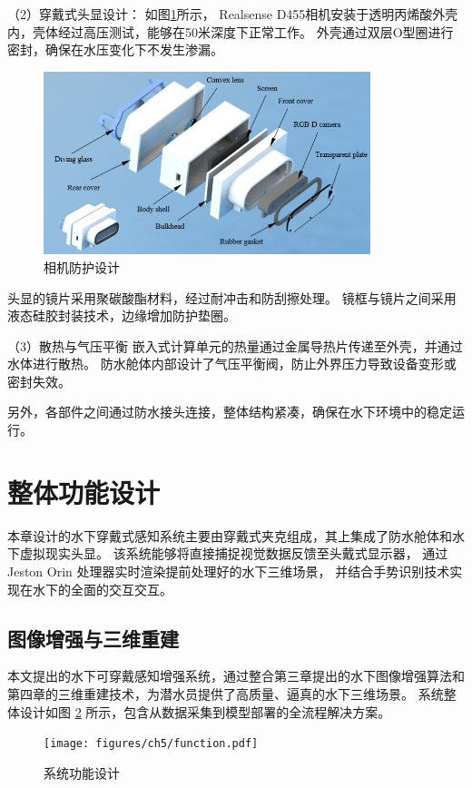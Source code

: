 （2）穿戴式头显设计：
如图\ref{img:camera}所示，
Realsense D455相机安装于透明丙烯酸外壳内，壳体经过高压测试，能够在50米深度下正常工作。
外壳通过双层O型圈进行密封，确保在水压变化下不发生渗漏。
\begin{figure}[ht]
    \centering
    \includegraphics[width=0.85\textwidth]{figures/ch5/headscreen.jpg}
    \caption{相机防护设计}
    \label{img:camera}
\end{figure}

头显的镜片采用聚碳酸酯材料，经过耐冲击和防刮擦处理。
镜框与镜片之间采用液态硅胶封装技术，边缘增加防护垫圈。

（3）散热与气压平衡
嵌入式计算单元的热量通过金属导热片传递至外壳，并通过水体进行散热。
防水舱体内部设计了气压平衡阀，防止外界压力导致设备变形或密封失效。

另外，各部件之间通过防水接头连接，整体结构紧凑，确保在水下环境中的稳定运行。

\section{整体功能设计}
本章设计的水下穿戴式感知系统主要由穿戴式夹克组成，其上集成了防水舱体和水下虚拟现实头显。
该系统能够将直接捕捉视觉数据反馈至头戴式显示器，
通过 Jeston Orin 处理器实时渲染提前处理好的水下三维场景，
并结合手势识别技术实现在水下的全面的交互交互。

\subsection{图像增强与三维重建}
本文提出的水下可穿戴感知增强系统，通过整合第三章提出的水下图像增强算法和第四章的三维重建技术，为潜水员提供了高质量、逼真的水下三维场景。
系统整体设计如图 \ref{img:function} 所示，包含从数据采集到模型部署的全流程解决方案。
\begin{figure}[ht]
    \centering
    \texttt{[image: figures/ch5/function.pdf]}
    \caption{系统功能设计}
    \label{img:function}
\end{figure}


